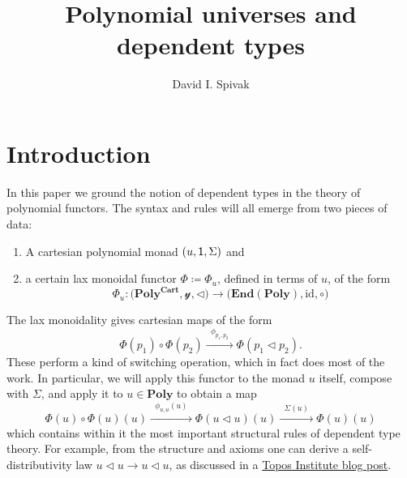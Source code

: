 \documentclass[11pt, one side, article]{memoir}
\theoremstyle{definition}
\theoremstyle{plain}
\newcommand{\Cat}[1]{\mathbf{#1}}%
\newcommand{\id}{\mathrm{id}}
\newcommand{\too}{\longrightarrow}
\newcommand{\Too}[1]{\xrightarrow{\;\;#1\;\;}}
\newcommand{\en}{\Cat{End}}
\newcommand{\yon}{\mathcal{y}}
\newcommand{\poly}{\Cat{Poly}}
\newcommand{\polycart}{\poly^{\Cat{Cart}}}
\newcommand{\0}{\textsf{0}}
\newcommand{\1}{\tn{\textsf{1}}}
\newcommand{\tri}{\mathbin{\triangleleft}}
\begin{document}
\title{Polynomial universes and dependent types}

\author{David I. Spivak}

\date{\vspace{-.2in}}

\maketitle

\begin{abstract}
\end{abstract}


\chapter{Introduction}

In this paper we ground the notion of dependent types in the theory of polynomial functors. The syntax and rules will all emerge from two pieces of data:
\begin{enumerate}
	\item A cartesian polynomial monad $(u,\1,\Sigma)$ and
	\item a certain lax monoidal functor $\Phi\coloneqq\Phi_u$, defined in terms of $u$, of the form
\[
\Phi_u\colon\Big(\polycart,\yon,\tri\Big)\too\Big(\en(\poly),\id,\circ\Big)
\]
\end{enumerate}
The lax monoidality gives cartesian maps of the form 
\[
\Phi(p_1)\circ\Phi(p_2)
\Too{\phi_{p_1,p_2}}
\Phi(p_1\tri p_2).
\]
These perform a kind of switching operation, which in fact does most of the work. In particular, we will apply this functor to the monad $u$ itself, compose with $\Sigma$, and apply it to $u\in\poly$ to obtain a map
\begin{equation}\label{eqn.main}
\Phi(u)\circ\Phi(u)(u)
\Too{\phi_{u,u}(u)}
\Phi(u\tri u)(u)
\Too{\Sigma(u)}
\Phi(u)(u)
\end{equation}
which contains within it the most important structural rules of dependent type theory. For example, from the structure and axioms one can derive a self-distributivity law $u\tri u\to u\tri u$, as discussed in a \href{https://topos.site/blog/2021/07/jump-monads-from-conjugation-to-dependent-types/}{Topos Institute blog post}.
\end{document}
